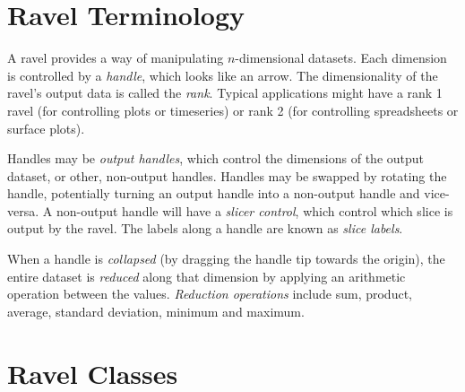 \documentclass{article}
\begin{document}
\section{Ravel Terminology}

A ravel provides a way of manipulating $n$-dimensional datasets. Each
dimension is controlled by a {\em handle}, which looks like an
arrow. The dimensionality of the ravel's output data is called the
{\em rank}. Typical applications might have a rank 1 ravel (for
controlling plots or timeseries) or rank 2 (for controlling
spreadsheets or surface plots).

Handles may be {\em output handles}, which control the dimensions of
the output dataset, or other, non-output handles. Handles may
be swapped by rotating the handle, potentially turning an output
handle into a non-output handle and vice-versa. A non-output handle
will have a {\em slicer control}, which control which slice is output
by the ravel. The labels along a handle are known as {\em slice labels}.

When a handle is {\em collapsed} (by dragging the handle tip towards
the origin), the entire dataset is {\em reduced} along that dimension
by applying an arithmetic operation between the values. {\em Reduction
operations} include sum, product, average, standard deviation, minimum
and maximum.

\section{Ravel Classes}

\begin{latexonly}
\end{latexonly}
\end{document}
